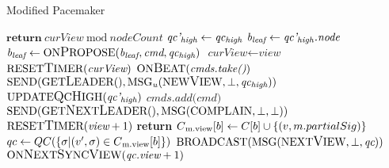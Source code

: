 \begin{algorithm}[h!]
	\caption{Modified Pacemaker}\label{pacemaker}
	\begin{algorithmic}[1]
	 \label{code_getleader}
		\color{Green}
		\State $\textbf{return}\ \textit{curView}\ \text{mod}\ \textit{nodeCount}$
		\color{black}
	\EndFunction
			\State $ \textit{qc'\textsubscript{high}} \gets \textit{qc\textsubscript{high}} $
			\State $ \textit{b\textsubscript{leaf}} \gets \textit{qc'\textsubscript{high}.node}$
		\EndIf
	\EndProcedure
			\State $ \textit{b\textsubscript{leaf}} \gets \text{ON{\large P}ROPOSE}(\textit{b\textsubscript{leaf}}, \textit{cmd}, \textit{qc\textsubscript{high}})$
		\EndIf
	\EndProcedure
	 \label{code_onnextsyncview}
		\color{Green}
		\State $ \textit{curView} \gets \textit{view}$
		\State $ \text{RESET{\large T}IMER}(\textit{curView})$
		\State $ \text{ON{\large B}EAT}(\textit{cmds.take()})$
		\color{black}
		\State $\text{SEND}(\text{GET{\large L}EADER}(), \text{MSG}\textsubscript{\textit{u}}(\text{NEW{\large V}IEW}, \bot, \textit{qc\textsubscript{high}}))$
	\EndProcedure
		\State $ \text{UPDATE{\large Q}C{\large H}IGH}(\textit{qc'\textsubscript{high}}) $
	\EndProcedure
	\color{Green}
	 \label{code_onreceiveclientreq}
		\State $ \textit{cmds.add(cmd)} $
	\EndProcedure
	 \label{code_ontimeout}
		\State $ \text{SEND}(\text{GET{\large N}EXT{\large L}EADER}(), \text{MSG}(\text{COMPLAIN}, \bot, \bot)) $ \label{code_timeout}
		\State $ \text{RESET{\large T}IMER}(\textit{view} + 1) $
	\EndProcedure
	 \label{code_onreceivecomplain}
				\State \textbf{return}
			\EndIf
			\State $C\textsubscript{m.view}[b] \gets C[b] \cup \{(v, m.partialSig)\}$
				\State $qc \gets QC(\{ \sigma | (v', \sigma) \in C\textsubscript{m.view}[b]\})$
				\State $\text{BROADCAST}(\text{MSG}(\text{NEXT{\large V}IEW}, \bot, \textit{qc}))$ \label{code_nextviewmsg}
			\EndIf
		\EndIf
	\EndProcedure
	 \label{code_onreceiveany}
				\State $\text{ON{\large N}EXT{\large S}YNC{\large V}IEW}(\textit{qc.view} + 1)$ \label{code_gotqc}
		\EndIf
	\EndProcedure
	\end{algorithmic}
\end{algorithm}

